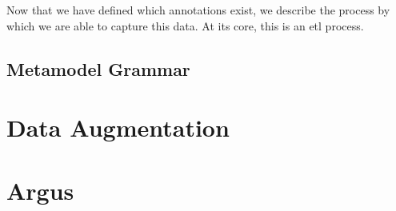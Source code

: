 Now that we have defined which annotations exist, we describe the process by which we are able to capture this data. At its core, this is an \gls{etl} process. 


\subsection{Metamodel Grammar}


\section{Data Augmentation}

\section{Argus}


